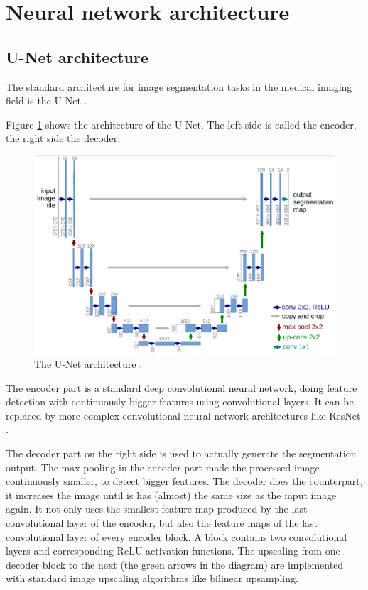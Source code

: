 \section{Neural network architecture}
\subsection{U-Net architecture}
The standard architecture for image segmentation tasks in the medical imaging field is the U-Net \cite{ronneberger2015u}.

Figure \ref{unet} shows the architecture of the U-Net. The left side is called the encoder, the right side the decoder.

\begin{figure}[H]
\centering
\includegraphics[width=14cm]{images/unet.png}
\caption{The U-Net architecture \cite{ronneberger2015u}.}
\label{unet}
\end{figure}

The encoder part is a standard deep convolutional neural network, doing feature detection with continuously bigger features using convolutional layers.
It can be replaced by more complex convolutional neural network architectures like ResNet \cite{he2016deep}.

The decoder part on the right side is used to actually generate the segmentation output. The max pooling in the encoder part made the processed image continuously smaller,
to detect bigger features. The decoder does the counterpart, it increases the image until is has (almost) the same size as the input image again. It not only uses
the smallest feature map produced by the last convolutional layer of the encoder, but also the feature maps of the last convolutional layer of every encoder block.
A block contains two convolutional layers and corresponding ReLU activation functions. The upscaling from one decoder block to the next (the green arrows in the diagram) are
implemented with standard image upscaling algorithms like bilinear upsampling.

